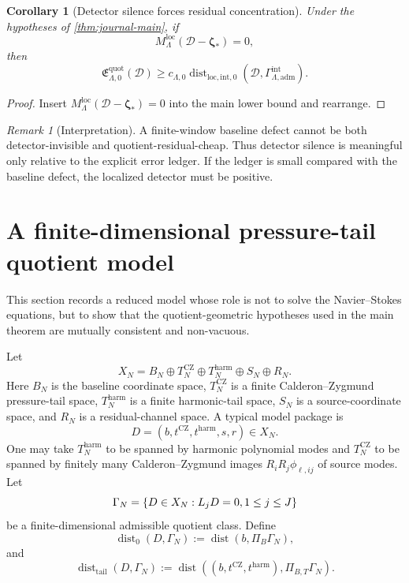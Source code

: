 \documentclass[11pt]{article}
\numberwithin{equation}{section}
\newtheorem{corollary}[corollary]{Corollary}
\theoremstyle{definition}
\theoremstyle{remark}
\newtheorem{remark}[remark]{Remark}
\DeclareMathOperator{\dist}{dist}
\newcommand{\loc}{\mathrm{loc}}
\newcommand{\intg}{\mathrm{int}}
\newcommand{\tail}{\mathrm{tail}}
\newcommand{\adm}{\mathrm{adm}}
\newcommand{\harm}{\mathrm{harm}}
\newcommand{\CZ}{\mathrm{CZ}}
\newcommand{\quot}{\mathrm{quot}}
\newcommand{\Dist}{\operatorname{dist}}
\newcommand{\calD}{\mathcal D}
\newcommand{\bzeta}{\boldsymbol\zeta}
\begin{document}
\begin{corollary}[Detector silence forces residual concentration]\label{cor:detector-silence-final}
Under the hypotheses of \cref{thm:journal-main}, if
\[
        M_\Lambda^{\loc}(\calD-\bzeta_*)=0,
\]
then
\[
        \mathfrak E^{\quot}_{\Lambda,0}(\calD)
        \ge
        c_{\Lambda,0}
        \Dist_{\loc,\intg,0}(\calD,\Gamma^{\intg}_{\Lambda,\adm}).
\]
\end{corollary}

\begin{proof}
Insert \(M_\Lambda^{\loc}(\calD-\bzeta_*)=0\) into the main lower bound and rearrange.
\end{proof}

\begin{remark}[Interpretation]
A finite-window baseline defect cannot be both detector-invisible and quotient-residual-cheap.  Thus detector silence is meaningful only relative to the explicit error ledger.  If the ledger is small compared with the baseline defect, the localized detector must be positive.
\end{remark}

\section{A finite-dimensional pressure-tail quotient model}\label{sec:finite-dimensional-model-final}

This section records a reduced model whose role is not to solve the Navier--Stokes equations, but to show that the quotient-geometric hypotheses used in the main theorem are mutually consistent and non-vacuous.

Let
\[
        X_N=B_N\oplus T_N^{\CZ}\oplus T_N^{\harm}\oplus S_N\oplus R_N.
\]
Here \(B_N\) is the baseline coordinate space, \(T_N^{\CZ}\) is a finite Calderon--Zygmund pressure-tail space, \(T_N^{\harm}\) is a finite harmonic-tail space, \(S_N\) is a source-coordinate space, and \(R_N\) is a residual-channel space.  A typical model package is
\[
        D=(b,t^{\CZ},t^{\harm},s,r)\in X_N.
\]
One may take \(T_N^{\harm}\) to be spanned by harmonic polynomial modes and \(T_N^{\CZ}\) to be spanned by finitely many Calderon--Zygmund images \(R_iR_j\phi_{\ell,ij}\) of source modes.  Let
\[
        \Gamma_N=\{D\in X_N: L_jD=0,\\ 1\le j\le J\}
\]
be a finite-dimensional admissible quotient class.  Define
\[
        \Dist_0(D,\Gamma_N):=\dist(b,\Pi_B\Gamma_N),
\]
and
\[
        \Dist_{\tail}(D,\Gamma_N):=
        \dist((b,t^{\CZ},t^{\harm}),\Pi_{B,T}\Gamma_N).
\]
\end{document}
